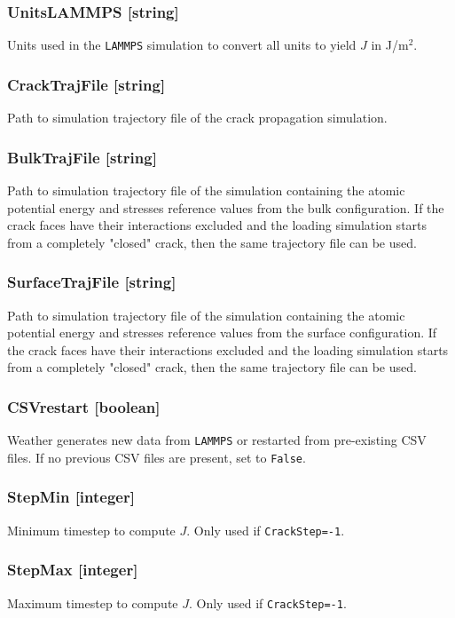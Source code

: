 \documentclass{ol-softwaremanual}
\begin{document}
\subsubsection*{UnitsLAMMPS [string]}
Units used in the \verb|LAMMPS| simulation to convert all units to yield $J$ in J/m$^2$.

\subsubsection*{CrackTrajFile [string]}
Path to simulation trajectory file of the crack propagation simulation.

\subsubsection*{BulkTrajFile [string]}
Path to simulation trajectory file of the simulation containing the atomic potential energy and stresses reference values from the bulk configuration. If the crack faces have their interactions excluded and the loading simulation starts from a completely "closed" crack, then the same trajectory file can be used.

\subsubsection*{SurfaceTrajFile [string]}
Path to simulation trajectory file of the simulation containing the atomic potential energy and stresses reference values from the surface configuration. If the crack faces have their interactions excluded and the loading simulation starts from a completely "closed" crack, then the same trajectory file can be used.

\subsubsection*{CSVrestart [boolean]}
Weather generates new data from \verb|LAMMPS| or restarted from pre-existing CSV files. If no previous CSV files are present, set to \verb|False|. 

\subsubsection*{StepMin [integer]}
Minimum timestep to compute $J$. Only used if \verb|CrackStep=-1|.

\subsubsection*{StepMax [integer]}
Maximum timestep to compute $J$. Only used if \verb|CrackStep=-1|.
\end{document}
